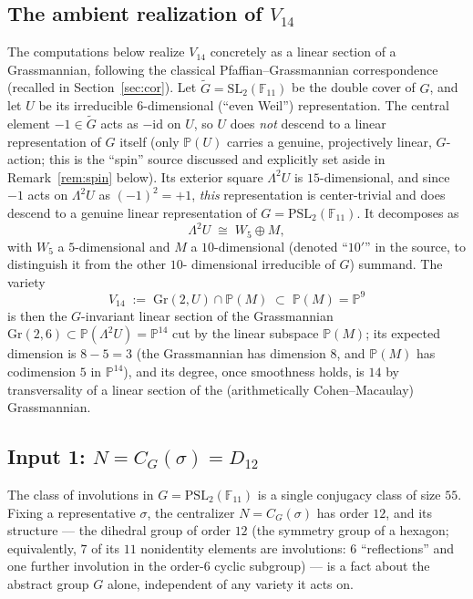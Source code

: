 \documentclass[11pt]{article}
\theoremstyle{plain}
\theoremstyle{definition}
\theoremstyle{remark}
\newcommand{\PSL}{\mathrm{PSL}_2(\mathbb{F}_{11})}
\newcommand{\SLg}{\mathrm{SL}_2(\mathbb{F}_{11})}
\newcommand{\Grr}{\mathrm{Gr}}
\newcommand{\PP}{\mathbb P}
\begin{document}
\subsection{The ambient realization of \texorpdfstring{$V_{14}$}{V14}}

The computations below realize $V_{14}$ concretely as a linear section
of a Grassmannian, following the classical Pfaffian--Grassmannian
correspondence (recalled in Section~\ref{sec:cor}). Let $\widetilde
G=\SLg$ be the double cover of $G$, and let $U$ be its irreducible
$6$-dimensional (``even Weil'') representation. The central element
$-1\in\widetilde G$ acts as $-\mathrm{id}$ on $U$, so $U$ does
\emph{not} descend to a linear representation of $G$ itself (only
$\PP(U)$ carries a genuine, projectively linear, $G$-action; this is
the ``spin'' source discussed and explicitly set aside in
Remark~\ref{rem:spin} below). Its exterior square $\Lambda^2U$ is
$15$-dimensional, and since $-1$ acts on $\Lambda^2U$ as $(-1)^2=+1$,
\emph{this} representation is center-trivial and does descend to a
genuine linear representation of $G=\PSL$. It decomposes as
\[
\Lambda^2U \;\cong\; W_5 \oplus M,
\]
with $W_5$ a $5$-dimensional and $M$ a $10$-dimensional (denoted
``$10'$'' in the source, to distinguish it from the other $10$-
dimensional irreducible of $G$) summand. The variety
\[
V_{14} \;:=\; \Grr(2,U)\cap\PP(M) \;\subset\; \PP(M)=\PP^9
\]
is then the $G$-invariant linear section of the Grassmannian
$\Grr(2,6)\subset\PP(\Lambda^2U)=\PP^{14}$ cut by the linear subspace
$\PP(M)$; its expected dimension is $8-5=3$ (the Grassmannian has
dimension $8$, and $\PP(M)$ has codimension $5$ in $\PP^{14}$), and its
degree, once smoothness holds, is $14$ by transversality of a linear
section of the (arithmetically Cohen--Macaulay) Grassmannian.

\subsection{Input 1: \texorpdfstring{$N=C_G(\sigma)=D_{12}$}{N = centralizer of sigma = D12}}

The class of involutions in $G=\PSL$ is a single conjugacy class of
size $55$. Fixing a representative $\sigma$, the centralizer $N=C_G
(\sigma)$ has order $12$, and its structure --- the dihedral group of
order $12$ (the symmetry group of a hexagon; equivalently, $7$ of its
$11$ nonidentity elements are involutions: $6$ ``reflections'' and one
further involution in the order-$6$ cyclic subgroup) --- is a fact about
the abstract group $G$ alone, independent of any variety it acts on.
\end{document}
